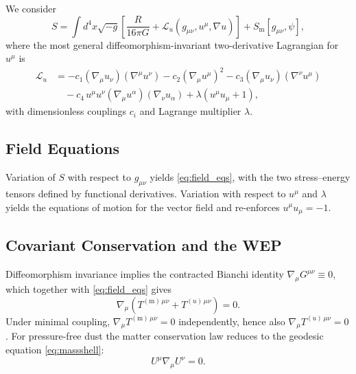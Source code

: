\documentclass[12pt,a4paper]{article}
\newcommand{\Sm}{S_{\mathrm{m}}}
\begin{document}
We consider~\citep{jacobson2001,jacobson2008}
\begin{equation}
  S=\int d^{4}x\sqrt{-g}\!\left[\frac{R}{16\pi G}
    +\mathcal{L}_{u}(g_{\mu\nu},u^{\mu},\nabla u)\right]+\Sm[g_{\mu\nu},\psi],
  \label{eq:S}
\end{equation}
where the most general diffeomorphism-invariant two-derivative Lagrangian for
$u^{\mu}$ is~\citep{jacobson2001}
\begin{align}
  \mathcal{L}_{u} &= -c_{1}(\nabla_{\!\mu}u_{\nu})(\nabla^{\mu}u^{\nu})
                    -c_{2}(\nabla_{\!\mu}u^{\mu})^{2}
                    -c_{3}(\nabla_{\!\mu}u_{\nu})(\nabla^{\nu}u^{\mu})\nonumber\\
                  &\quad -c_{4}\,u^{\mu}u^{\nu}(\nabla_{\!\mu}u^{\alpha})
                             (\nabla_{\!\nu}u_{\alpha})
                    +\lambda(u^{\mu}u_{\mu}+1),
  \label{eq:Lu}
\end{align}
with dimensionless couplings $c_{i}$ and Lagrange multiplier $\lambda$.

\subsection{Field Equations}

Variation of $S$ with respect to $g_{\mu\nu}$ yields \cref{eq:field_eqs},
with the two stress--energy tensors defined by functional derivatives.
Variation with respect to $u^{\mu}$ and $\lambda$ yields the equations of
motion for the vector field and re-enforces $u^{\mu}u_{\mu}=-1$.

\subsection{Covariant Conservation and the WEP}

Diffeomorphism invariance implies the contracted Bianchi identity
$\nabla_{\!\mu}G^{\mu\nu}\equiv 0$, which together with \cref{eq:field_eqs}
gives
\begin{equation}
  \nabla_{\!\mu}\!\left(T^{(\mathrm{m})\,\mu\nu}+T^{(u)\,\mu\nu}\right)=0.
\end{equation}
Under minimal coupling, $\nabla_{\!\mu}T^{(\mathrm{m})\,\mu\nu}=0$
independently, hence also $\nabla_{\!\mu}T^{(u)\,\mu\nu}=0$. For
pressure-free dust the matter conservation law reduces to the geodesic
equation \eqref{eq:massshell}:
\begin{equation}
  U^{\mu}\nabla_{\!\mu}U^{\nu}=0.
  \label{eq:geodesic}
\end{equation}
\end{document}
